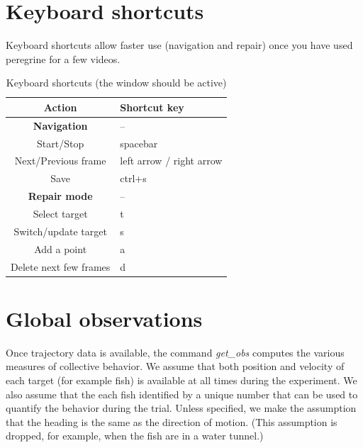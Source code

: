 \documentclass[11pt]{article}
\begin{document}
\section{Keyboard shortcuts} 
\label{sec:keyboardshortcuts}

Keyboard shortcuts allow faster use (navigation and repair) once you have used peregrine for a few videos. 
\begin{table}[h]
\caption{Keyboard shortcuts (the window should be active)}
\begin{center}
\begin{tabular}[t]{cl}
\hline
Action &  Shortcut key\\
\hline
\textbf{Navigation} & -- \\
 Start/Stop & spacebar \\
 Next/Previous frame & left arrow / right arrow \\
 Save & ctrl+s \\
\textbf{Repair mode} & -- \\
Select target&  t \\
Switch/update target & s \\
Add a point &  a \\
Delete next few frames &  d\\
\end{tabular}
\end{center}
\label{tab:keyboardshortcuts}
\end{table}

\section{Global observations}

Once trajectory data is available, the command \emph{get\_obs} computes the  various measures of collective behavior. We assume that both position and velocity of each target (for example fish) is available at all times during the experiment. We also assume that the each fish identified by a unique number that can be used to quantify the behavior during the trial. Unless specified, we make the assumption that the heading is the same as the direction of motion. (This assumption is dropped, for example, when the fish are in a water tunnel.)
\end{document}
